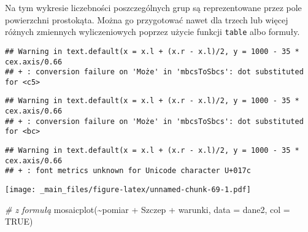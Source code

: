 \documentclass[
]{book}
\newenvironment{Shaded}{\begin{snugshade}}{\end{snugshade}}
\newcommand{\AttributeTok}[1]{\textcolor[rgb]{0.77,0.63,0.00}{#1}}
\newcommand{\CommentTok}[1]{\textcolor[rgb]{0.56,0.35,0.01}{\textit{#1}}}
\newcommand{\ConstantTok}[1]{\textcolor[rgb]{0.00,0.00,0.00}{#1}}
\newcommand{\FunctionTok}[1]{\textcolor[rgb]{0.00,0.00,0.00}{#1}}
\newcommand{\NormalTok}[1]{#1}
\newcommand{\SpecialCharTok}[1]{\textcolor[rgb]{0.00,0.00,0.00}{#1}}
\newcommand{\StringTok}[1]{\textcolor[rgb]{0.31,0.60,0.02}{#1}}
\begin{document}
Na tym wykresie liczebności poszczególnych grup są reprezentowane przez pole powierzchni prostokąta. Można go przygotować nawet dla trzech lub więcej różnych zmiennych wyliczeniowych poprzez użycie funkcji \texttt{table} albo formuły.

\begin{Shaded}
\end{Shaded}

\begin{verbatim}
## Warning in text.default(x = x.l + (x.r - x.l)/2, y = 1000 - 35 * cex.axis/0.66
## + : conversion failure on 'Może' in 'mbcsToSbcs': dot substituted for <c5>
\end{verbatim}

\begin{verbatim}
## Warning in text.default(x = x.l + (x.r - x.l)/2, y = 1000 - 35 * cex.axis/0.66
## + : conversion failure on 'Może' in 'mbcsToSbcs': dot substituted for <bc>
\end{verbatim}

\begin{verbatim}
## Warning in text.default(x = x.l + (x.r - x.l)/2, y = 1000 - 35 * cex.axis/0.66
## + : font metrics unknown for Unicode character U+017c
\end{verbatim}

\texttt{[image: \_main\_files/figure-latex/unnamed-chunk-69-1.pdf]}

\begin{Shaded}
\begin{Highlighting}[]
\CommentTok{\# z formułą}
\FunctionTok{mosaicplot}\NormalTok{(}\SpecialCharTok{\textasciitilde{}}\NormalTok{pomiar }\SpecialCharTok{+}\NormalTok{ Szczep }\SpecialCharTok{+}\NormalTok{ warunki, }\AttributeTok{data =}\NormalTok{ dane2, }\AttributeTok{col =} \ConstantTok{TRUE}\NormalTok{)}
\end{Highlighting}
\end{Shaded}
\end{document}
